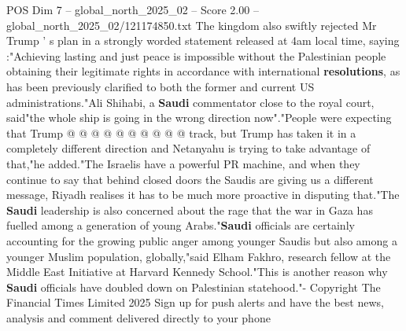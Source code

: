 \begin{textsample}{POS Dim 7 – global\_north\_2025\_02 – Score 2.00 – global\_north\_2025\_02/121174850.txt}
The kingdom also swiftly rejected Mr Trump ' s plan in a strongly worded statement released at 4am local time, saying :"Achieving lasting and just peace is impossible without the Palestinian people obtaining their legitimate rights in accordance with international \textbf{resolutions}, as has been previously clarified to both the former and current US administrations."Ali Shihabi, a \textbf{Saudi} commentator close to the royal court, said"the whole ship is going in the wrong direction now"."People were expecting that Trump @ @ @ @ @ @ @ @ @ @ track, but Trump has taken it in a completely different direction and Netanyahu is trying to take advantage of that,"he added."The Israelis have a powerful PR machine, and when they continue to say that behind closed doors the Saudis are giving us a different message, Riyadh realises it has to be much more proactive in disputing that."The \textbf{Saudi} leadership is also concerned about the rage that the war in Gaza has fuelled among a generation of young Arabs."\textbf{Saudi} officials are certainly accounting for the growing public anger among younger Saudis but also among a younger Muslim population, globally,"said Elham Fakhro, research fellow at the Middle East Initiative at Harvard Kennedy School."This is another reason why \textbf{Saudi} officials have doubled down on Palestinian statehood."- Copyright The Financial Times Limited 2025 Sign up for push alerts and have the best news, analysis and comment delivered directly to your phone

\end{textsample}
